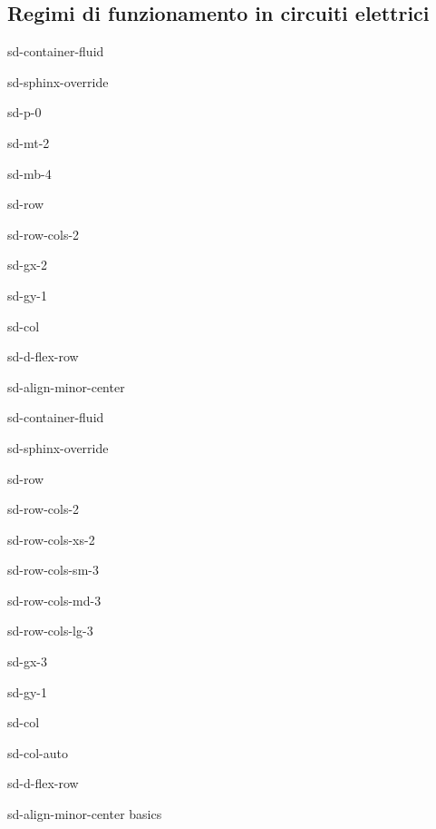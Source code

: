 \documentclass[letterpaper,10pt,english]{jupyterBook}
\begin{document}
\subsection{Regimi di funzionamento in circuiti elettrici}
\label{\detokenize{ch/circuits-electric-regimes:regimi-di-funzionamento-in-circuiti-elettrici}}\label{\detokenize{ch/circuits-electric-regimes:classical-electromagnetism-circuits-electric-regimes}}\label{\detokenize{ch/circuits-electric-regimes::doc}}
\sphinxstepscope

\begin{sphinxuseclass}{sd-container-fluid}
\begin{sphinxuseclass}{sd-sphinx-override}
\begin{sphinxuseclass}{sd-p-0}
\begin{sphinxuseclass}{sd-mt-2}
\begin{sphinxuseclass}{sd-mb-4}
\begin{sphinxuseclass}{sd-row}
\begin{sphinxuseclass}{sd-row-cols-2}
\begin{sphinxuseclass}{sd-gx-2}
\begin{sphinxuseclass}{sd-gy-1}
\begin{sphinxuseclass}{sd-col}
\begin{sphinxuseclass}{sd-d-flex-row}
\begin{sphinxuseclass}{sd-align-minor-center}
\begin{sphinxuseclass}{sd-container-fluid}
\begin{sphinxuseclass}{sd-sphinx-override}
\begin{sphinxuseclass}{sd-row}
\begin{sphinxuseclass}{sd-row-cols-2}
\begin{sphinxuseclass}{sd-row-cols-xs-2}
\begin{sphinxuseclass}{sd-row-cols-sm-3}
\begin{sphinxuseclass}{sd-row-cols-md-3}
\begin{sphinxuseclass}{sd-row-cols-lg-3}
\begin{sphinxuseclass}{sd-gx-3}
\begin{sphinxuseclass}{sd-gy-1}
\begin{sphinxuseclass}{sd-col}
\begin{sphinxuseclass}{sd-col-auto}
\begin{sphinxuseclass}{sd-d-flex-row}
\begin{sphinxuseclass}{sd-align-minor-center}
\sphinxAtStartPar
basics


\end{sphinxuseclass}
\end{sphinxuseclass}
\end{sphinxuseclass}
\end{sphinxuseclass}
\end{sphinxuseclass}
\end{sphinxuseclass}
\end{sphinxuseclass}
\end{sphinxuseclass}
\end{sphinxuseclass}
\end{sphinxuseclass}
\end{sphinxuseclass}
\end{sphinxuseclass}
\end{sphinxuseclass}
\end{sphinxuseclass}
\end{sphinxuseclass}
\end{sphinxuseclass}
\end{sphinxuseclass}
\end{sphinxuseclass}
\end{sphinxuseclass}
\end{sphinxuseclass}
\end{sphinxuseclass}
\end{sphinxuseclass}
\end{sphinxuseclass}
\end{sphinxuseclass}
\end{sphinxuseclass}
\end{sphinxuseclass}
\end{document}
